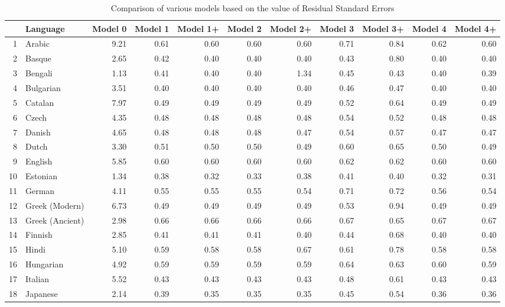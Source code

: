 \documentclass[a4paper]{article}
\begin{document}
\pagestyle{empty}
\begin{table}
\caption{Comparison of various models based on the value of Residual Standard Errors} \label{table:NSFAccuDivBG}%
\centering
\begin{tabular}{rlrrrrrrrrr}
  \hline
 & Language & Model 0 & Model 1 & Model 1+ & Model 2 & Model 2+ & Model 3 & Model 3+ & Model 4 & Model 4+ \\ 
  \hline
1 & Arabic & 9.21 & 0.61 & 0.60 & 0.60 & 0.60 & 0.71 & 0.84 & 0.62 & 0.60 \\ 
  2 & Basque & 2.65 & 0.42 & 0.40 & 0.40 & 0.40 & 0.43 & 0.80 & 0.40 & 0.40 \\ 
  3 & Bengali & 1.13 & 0.41 & 0.40 & 0.40 & 1.34 & 0.45 & 0.43 & 0.40 & 0.39 \\ 
  4 & Bulgarian & 3.51 & 0.40 & 0.40 & 0.40 & 0.40 & 0.46 & 0.47 & 0.40 & 0.40 \\ 
  5 & Catalan & 7.97 & 0.49 & 0.49 & 0.49 & 0.49 & 0.52 & 0.64 & 0.49 & 0.49 \\ 
  6 & Czech & 4.35 & 0.48 & 0.48 & 0.48 & 0.48 & 0.54 & 0.52 & 0.48 & 0.48 \\ 
  7 & Danish & 4.65 & 0.48 & 0.48 & 0.48 & 0.47 & 0.54 & 0.57 & 0.47 & 0.47 \\ 
  8 & Dutch & 3.30 & 0.51 & 0.50 & 0.50 & 0.49 & 0.60 & 0.65 & 0.50 & 0.49 \\ 
  9 & English & 5.85 & 0.60 & 0.60 & 0.60 & 0.60 & 0.62 & 0.62 & 0.60 & 0.60 \\ 
  10 & Estonian & 1.34 & 0.38 & 0.32 & 0.33 & 0.38 & 0.41 & 0.40 & 0.32 & 0.31 \\ 
  11 & German & 4.11 & 0.55 & 0.55 & 0.55 & 0.54 & 0.71 & 0.72 & 0.56 & 0.54 \\ 
  12 & Greek (Modern) & 6.73 & 0.49 & 0.49 & 0.49 & 0.49 & 0.53 & 0.94 & 0.49 & 0.49 \\ 
  13 & Greek (Ancient) & 2.98 & 0.66 & 0.66 & 0.66 & 0.66 & 0.67 & 0.65 & 0.67 & 0.67 \\ 
  14 & Finnish & 2.85 & 0.41 & 0.41 & 0.41 & 0.40 & 0.44 & 0.68 & 0.40 & 0.40 \\ 
  15 & Hindi & 5.10 & 0.59 & 0.58 & 0.58 & 0.67 & 0.61 & 0.78 & 0.58 & 0.58 \\ 
  16 & Hungarian & 4.92 & 0.59 & 0.59 & 0.59 & 0.59 & 0.64 & 0.63 & 0.60 & 0.59 \\ 
  17 & Italian & 5.52 & 0.43 & 0.43 & 0.43 & 0.43 & 0.48 & 0.61 & 0.43 & 0.43 \\ 
  18 & Japanese & 2.14 & 0.39 & 0.35 & 0.35 & 0.35 & 0.45 & 0.54 & 0.36 & 0.36 \\ 

\end{tabular}
\end{table}
\end{document}
